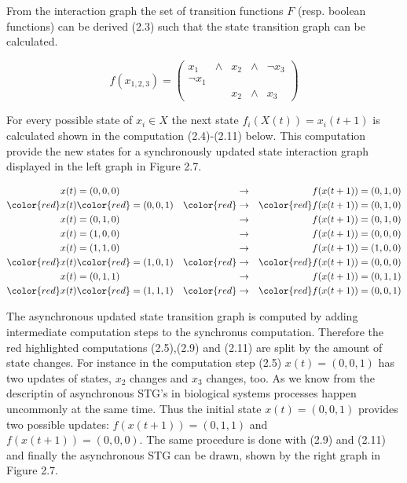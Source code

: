 From the interaction graph the set of transition functions $F$ (resp. boolean functions) can be derived (2.3) such that the state transition graph can be calculated.

\begin{equation}
f(x_{1,2,3}) = 
\begin{pmatrix}
x_1      & \land & x_2 & \land &\neg x_3\\
\neg x_1 &       &      &       & \\
         &       & x_2  &\land & x_3
\end{pmatrix}
\end{equation}


For every possible state of $x_i\in X$ the next state $f_{i}(X(t))=x_{i}(t+1)$ is calculated shown in the computation (2.4)-(2.11) below. This computation provide the new states for a synchronously updated state interaction graph displayed in the left graph in Figure 2.7.\citep{REMY2008335}


\begin{align}
x(t)& =(0,0,0) &\rightarrow & &f(x(t+1)) = (0,1,0)\\
\color{red}x(t)& \color{red}=(0,0,1) &\color{red}\rightarrow & &\color{red}f(x(t+1)) = (0,1,0)\\
x(t)& =(0,1,0) &\rightarrow & &f(x(t+1)) = (0,1,0)\\
x(t)& =(1,0,0) &\rightarrow & &f(x(t+1)) = (0,0,0)\\
x(t)& =(1,1,0) &\rightarrow & &f(x(t+1)) = (1,0,0)\\
\color{red}x(t)& \color{red}=(1,0,1) &\color{red}\rightarrow & &\color{red}f(x(t+1)) = (0,0,0)\\
x(t)& =(0,1,1) &\rightarrow & &f(x(t+1)) = (0,1,1)\\
\color{red}x(t)& \color{red}=(1,1,1) &\color{red}\rightarrow & &\color{red}f(x(t+1)) = (0,0,1)
\end{align}

The asynchronous updated state transition graph is computed by adding intermediate computation steps to the synchronus computation. Therefore the red highlighted computations (2.5),(2.9) and (2.11) are split by the amount of state changes. For instance in the computation step (2.5) $x(t)=(0,0,1)$ has two updates of states, $x_2$ changes and $x_3$ changes, too. As we know from the descriptin of asynchronous STG's in biological systems processes happen uncommonly at the same time. Thus the initial state $x(t)=(0,0,1)$ provides two possible updates: $f(x(t+1))=(0,1,1)$ and $f(x(t+1))=(0,0,0)$. The same procedure is done with (2.9) and (2.11) and finally the asynchronous STG can be drawn, shown by the right graph in Figure 2.7. 

